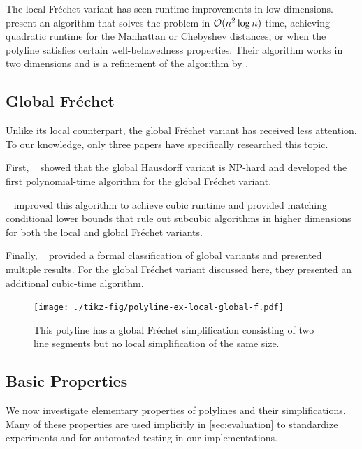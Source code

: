 The local Fréchet variant has seen runtime improvements in low dimensions. ~\cite{polyline_simplification_under_the_local_frechet_distance_has_almost_quadratic_runtime_in_2d_storandtetal} present an algorithm that solves the problem in \(\mathcal{O}(n^2 \log n)\) time, achieving quadratic runtime for the Manhattan or Chebyshev distances, or when the polyline satisfies certain well-behavedness properties. Their algorithm works in two dimensions and is a refinement of the algorithm by \citeauthor{computing_the_frechet_distance_between_two_polygonal_curves}.

\subsection{Global Fréchet}
Unlike its local counterpart, the global Fréchet variant has received less attention. To our knowledge, only three papers have specifically researched this topic.

First, \citeauthor{on_optimal_polyline_simplification_using_the_hausdorff_and_frechet_distance}~\cite{on_optimal_polyline_simplification_using_the_hausdorff_and_frechet_distance} showed that the global Hausdorff variant is NP-hard and developed the first polynomial-time algorithm for the global Fréchet variant.

\citeauthor{polyline_simplification_has_cubic_complexity_bringmannetal}~\cite{polyline_simplification_has_cubic_complexity_bringmannetal} improved this algorithm to achieve cubic runtime and provided matching conditional lower bounds that rule out subcubic algorithms in higher dimensions for both the local and global Fréchet variants.

Finally, \citeauthor{global_curve_simplification}~\cite{global_curve_simplification} provided a formal classification of global variants and presented multiple results. For the global Fréchet variant discussed here, they presented an additional cubic-time algorithm.

\begin{figure}[b]
  \centering
  \texttt{[image: ./tikz-fig/polyline-ex-local-global-f.pdf]}
  \caption{This polyline has a global Fréchet simplification consisting of two line segments but no local simplification of the same size.}
  \label{fig:polyline-ex-local-global-f}
\end{figure}

\subsection{Basic Properties}
We now investigate elementary properties of polylines and their simplifications. Many of these properties are used implicitly in \cref{sec:evaluation} to standardize experiments and for automated testing in our implementations.

